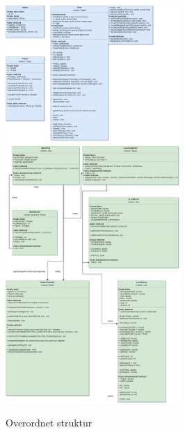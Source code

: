\documentclass[]{article}
\begin{document}
	\pagebreak
	\begin{figure}[h!]
		\centering
		\includegraphics[width=250px]{Structural_diagram.jpg}
		\label{fig:structure}
		\caption{Overordnet struktur}
	\end{figure}
	
\end{document}
